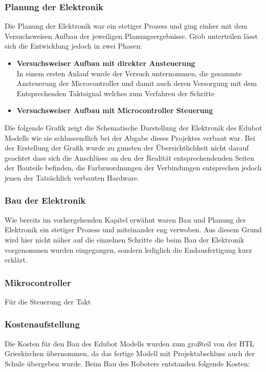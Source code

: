 \subsubsection{Planung der Elektronik}
Die Planung der Elektronik war ein stetiger Prozess und ging einher mit dem Versuchsweisen Aufbau der jeweiligen Planungsergebnisse. Grob unterteilen lässt sich die Entwicklung jedoch in zwei Phasen:
\begin{itemize}
\item \textbf{Versuchsweiser Aufbau mit direkter Ansteuerung}\\
In einem ersten Anlauf wurde der Versuch unternommen, die gesammte Ansteuerung der Microcontroller und damit auch deren Versorgung mit dem Entsprechenden Taktsignal welches zum Verfahren der Schritte 
\item \textbf{Versuchsweiser Aufbau mit Microcontroller Steuerung}\\
\end{itemize}
Die folgende Grafik zeigt die Schematische Darstellung der Elektronik des Edubot Modells wie sie schlussendlich bei der Abgabe dieses Projektes verbaut war. Bei der Erstellung der Grafik wurde zu gunsten der Übersichtlichkeit nicht darauf geachtet dass sich die Anschlüsse an den der Realität entsprechendenden Seiten der Bauteile befinden, die Farbzuordnungen der Verbindungen entsprechen jedoch jenen der Tatsächlich verbauten Hardware.
\subsubsection{Bau der Elektronik}
Wie bereits im vorhergehenden Kapitel erwähnt waren Bau und Planung der Elektronik ein stetiger Prozess und miteinander eng verwoben. Aus diesem Grund wird hier nicht näher auf die einzelnen Schritte die beim Bau der Elektronik vorgenommen wurden eingegangen, sondern lediglich die Endausfertigung kurz erklärt.
\subsubsection{Mikrocontroller}
Für die Steuerung der Takt
\subsubsection{Kostenaufstellung}
Die Kosten für den Bau des Edubot Modells wurden zum großteil von der HTL Grieskirchen übernommen, da das fertige Modell mit Projektabschluss auch der Schule übergeben wurde. Beim Bau des Roboters entstanden folgende Kosten:

